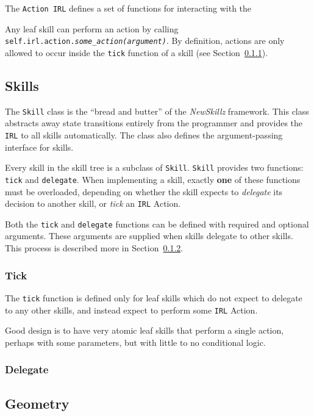 The \texttt{Action IRL} defines a set of functions for interacting with the 

Any leaf skill can perform an action by calling \texttt{self.irl.action.\textit{some\_action(argument)}}. By definition, actions are only allowed to occur inside the \texttt{tick} function of a skill (see Section~\ref{sec:tick}).

\subsection{Skills}

The \texttt{Skill} class is the ``bread and butter'' of the \textit{NewSkillz} framework. This class abstracts away state transitions entirely from the programmer and provides the \texttt{IRL} to all skills automatically. The class also defines the argument-passing interface for skills.

Every skill in the skill tree is a subclass of \texttt{Skill}. \texttt{Skill} provides two functions: \texttt{tick} and \texttt{delegate}. When implementing a skill, exactly \textbf{one} of these functions must be overloaded, depending on whether the skill expects to \textit{delegate} its decision to another skill, or \textit{tick} an \texttt{IRL} Action.

Both the \texttt{tick} and \texttt{delegate} functions can be defined with required and optional arguments. These arguments are supplied when skills delegate to other skills. This process is described more in Section~\ref{sec:delegate}.

\subsubsection{Tick}
\label{sec:tick}

The \texttt{tick} function is defined only for leaf skills which do not expect to delegate to any other skills, and instead expect to perform some \texttt{IRL} Action.

Good design is to have very atomic leaf skills that perform a single action, perhaps with some parameters, but with little to no conditional logic.

\subsubsection{Delegate}
\label{sec:delegate}

\subsection{Geometry}


